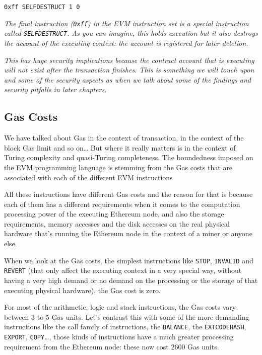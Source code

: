 \begin{lstlisting}[language=Solidity,numbers=none]
0xff SELFDESTRUCT 1 0
\end{lstlisting}

\emph{The final instruction (\texttt{0xff}) in the EVM instruction set
is a special instruction called \texttt{SELFDESTRUCT}. As you can
imagine, this holds execution but it also destroys the account of the
executing context: the account is registered for later deletion.}

\emph{This has huge security implications because the contract account
that is executing will not exist after the transaction finishes. This is
something we will touch upon and some of the security aspects as when we
talk about some of the findings and security pitfalls in later
chapters.}

\subsection{Gas Costs}\label{gas-costs}

We have talked about Gas in the context of transaction, in the context
of the block Gas limit and so on\ldots{} But where it really matters is
in the context of Turing complexity and quasi-Turing completeness. The
boundedness imposed on the EVM programming language is stemming from the
Gas costs that are associated with each of the different EVM
instructions

All these instructions have different Gas costs and the reason for that
is because each of them has a different requirements when it comes to
the computation processing power of the executing Ethereum node, and
also the storage requirements, memory accesses and the disk accesses on
the real physical hardware that's running the Ethereum node in the
context of a miner or anyone else.

When we look at the Gas costs, the simplest instructions like
\texttt{STOP}, \texttt{INVALID} and \texttt{REVERT} (that only affect
the executing context in a very special way, without having a very high
demand or no demand on the processing or the storage of that executing
physical hardware), the Gas cost is zero.

For most of the arithmetic, logic and stack instructions, the Gas costs
vary between 3 to 5 Gas units. Let's contrast this with some of the more
demanding instructions like the call family of instructions, the
\texttt{BALANCE}, the \texttt{EXTCODEHASH}, \texttt{EXPORT},
\texttt{COPY}\ldots, those kinds of instructions have a much greater
processing requirement from the Ethereum node: these now cost 2600 Gas
units.

